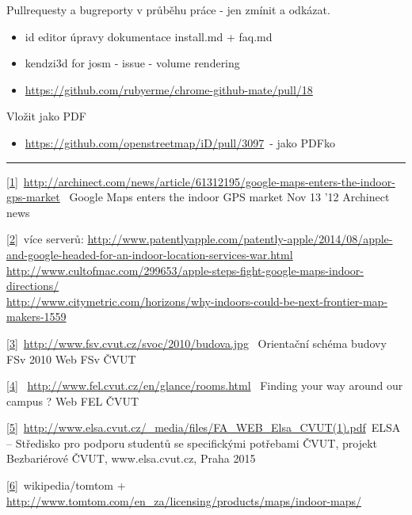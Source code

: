 Pullrequesty a bugreporty v průběhu práce - jen zmínit a odkázat.

\begin{itemize}
\tightlist
\item
  id editor úpravy dokumentace install.md + faq.md
\item
  kendzi3d for josm - issue - volume rendering
\item
  \href{}{https://github.com/rubyerme/chrome-github-mate/pull/18}
\end{itemize}

Vložit jako PDF

\begin{itemize}
\tightlist
\item
  \href{}{https://github.com/openstreetmap/iD/pull/3097}~- jako PDFko
\end{itemize}

\begin{center}\rule{0.5\linewidth}{\linethickness}\end{center}

\href{}{{[}1{]}}~\href{}{http://archinect.com/news/article/61312195/google-maps-enters-the-indoor-gps-market}~\textbar{} Google Maps enters the indoor GPS market \textbar{} Nov 13 '12 \textbar{} Archinect news

\href{}{{[}2{]}}~více serverů: \href{}{http://www.patentlyapple.com/patently-apple/2014/08/apple-and-google-headed-for-an-indoor-location-services-war.html}~\\
\href{}{http://www.cultofmac.com/299653/apple-steps-fight-google-maps-indoor-directions/}\\
\href{}{http://www.citymetric.com/horizons/why-indoors-could-be-next-frontier-map-makers-1559}~

\href{}{{[}3{]}}~\href{}{http://www.fsv.cvut.cz/svoc/2010/budova.jpg}~\textbar{} Orientační schéma budovy FSv \textbar{} 2010 \textbar{} Web FSv ČVUT

\href{}{{[}4{]}}~ \href{}{http://www.fel.cvut.cz/en/glance/rooms.html}~\textbar{} Finding your way around our campus \textbar{} ? \textbar{} Web FEL ČVUT

\href{}{{[}5{]}}~\href{}{http://www.elsa.cvut.cz/\_media/files/FA\_WEB\_Elsa\_CVUT(1).pdf}~ELSA -- Středisko pro podporu studentů se specifickými potřebami ČVUT, projekt Bezbariérové ČVUT, www.elsa.cvut.cz, Praha 2015

\href{}{{[}6{]}}~wikipedia/tomtom + \href{}{http://www.tomtom.com/en\_za/licensing/products/maps/indoor-maps/}~

